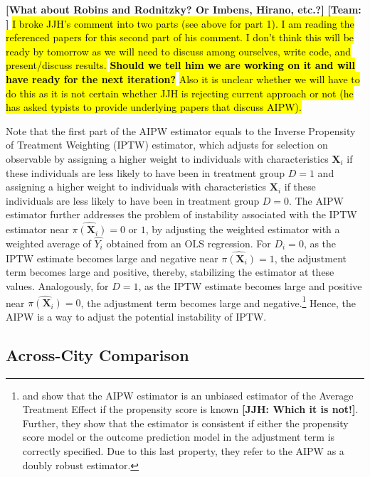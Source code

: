 \noindent \textbf{[What about Robins and Rodnitzky? Or Imbens, Hirano, etc.?]} \textbf{[Team:    ]}  \hl{I broke JJH's comment into two parts (see above for part 1). I am reading the referenced papers for this second part of his comment. I don't think this will be ready by tomorrow as we will need to discuss among ourselves, write code, and present/discuss results.} \textbf{\hl{Should we tell him we are working on it and will have ready for the next iteration?}} \hl{Also it is unclear whether we will have to do this as it is not certain whether JJH is rejecting current approach or not (he has asked typists to provide underlying papers that discuss AIPW).}


Note that the first part of the AIPW estimator equals to the Inverse Propensity of Treatment Weighting (IPTW) estimator, which adjusts for selection on observable by assigning a higher weight to individuals with characteristics $\boldsymbol{X}_i$ if these individuals are less likely to have been in treatment group $D = 1$ and assigning a higher weight to individuals with characteristics $\boldsymbol{X}_i$ if these individuals are less likely to have been in treatment group $D = 0$. The AIPW estimator further addresses the problem of instability associated with the IPTW estimator near $\hat{\pi(\boldsymbol{X}_i)} = 0$ or $1$, by adjusting the weighted estimator with a weighted average of $\hat{Y_i}$ obtained from an OLS regression. For $D_i = 0$, as the IPTW estimate becomes large and negative near $\hat{\pi(\boldsymbol{X}_i)} = 1$, the adjustment term becomes large and positive, thereby, stabilizing the estimator at these values. Analogously, for $D = 1$, as the IPTW estimate becomes large and positive near $\hat{\pi(\boldsymbol{X}_i)} = 0$, the adjustment term becomes large and negative.\footnote{\citet{Tsiatis_2006_Semiparametric-Theory} and \citet{Glynn-Quinn_2010_Political-Analysis} show that the AIPW estimator is an unbiased estimator of the Average Treatment Effect if the propensity score is known \textbf{[JJH: Which it is not!]}. Further, they show that the estimator is consistent if either the propensity score model or the outcome prediction model in the adjustment term is correctly specified. Due to this last property, they refer to the AIPW as a doubly robust estimator.}  Hence, the AIPW is a way to adjust the potential instability of IPTW.


\subsection{Across-City Comparison} \label{sec:across-city-analysis}
